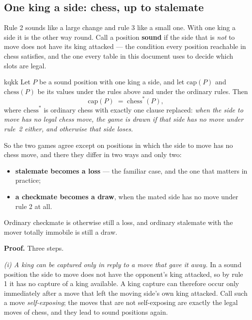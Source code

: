 \documentclass[11pt]{article}
\begin{document}
\subsection{One king a side: chess, up to stalemate}\label{sub:cap-onceking}

Rule 2 sounds like a large change and rule 3 like a small one. With one king a
side it is the other way round. Call a position \textbf{sound} if the side that
is \emph{not} to move does not have its king attacked --- the condition every
position reachable in chess satisfies, and the one every table in this document
uses to decide which slots are legal.

\begin{result}[title={Theorem. With one king a side, capture rules are chess with one clause changed}]{kqkk}
Let $P$ be a sound position with one king a side, and let $\mathrm{cap}(P)$ and
$\mathrm{chess}(P)$ be its values under the rules above and under the ordinary
rules. Then
\[
  \mathrm{cap}(P)\;=\;\mathrm{chess}^{\ast}(P),
\]
where $\mathrm{chess}^{\ast}$ is ordinary chess with exactly one clause
replaced: \emph{when the side to move has no legal chess move, the game is
drawn if that side has no move under rule~2 either, and otherwise that side
loses.}

\smallskip
So the two games agree except on positions in which the side to move has no
chess move, and there they differ in two ways and only two:
\begin{itemize}\setlength{\itemsep}{1pt}
\item \textbf{stalemate becomes a loss} --- the familiar case, and the one that
  matters in practice;
\item \textbf{a checkmate becomes a draw}, when the mated side has no move
  under rule 2 at all.
\end{itemize}
Ordinary checkmate is otherwise still a loss, and ordinary stalemate with the
mover totally immobile is still a draw.
\end{result}

\noindent
\textbf{Proof.} Three steps.

\emph{(i) A king can be captured only in reply to a move that gave it away.}
In a sound position the side to move does not have the opponent's king
attacked, so by rule 1 it has no capture of a king available. A king capture
can therefore occur only immediately after a move that left the moving side's
own king attacked. Call such a move \emph{self-exposing}; the moves that are
not self-exposing are exactly the legal moves of chess, and they lead to sound
positions again.
\end{document}
